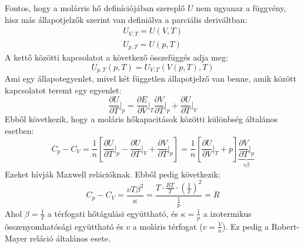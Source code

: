 \documentclass[a4paper,12pt]{article}
\begin{document}
Fontos, hogy a molárris hő definíciójában szereplő $U$ nem ugyanaz a függvény, hisz más állapotjelzők szerint van definiálva a parciális deriváltban:
\begin{equation}
    \begin{aligned}
        U_{V, T} = U(V, T) \\
        U_{p, T} = U(p, T)
    \end{aligned}
\end{equation}
A kettő közötti kapcsolatot a következő összefüggés adja meg:
\begin{equation}
U_{p, T} (p, T)= U_{V, T} (V(p, T), T)
\end{equation}
Ami egy állapotegyenlet, mivel két független állapotjelző van benne, amik között kapcsolatot teremt egy egyenlet:
\begin{equation}
    \frac{\partial U}{\partial T}\bigg|_{p} = \frac{\partial E}{\partial V}\bigg|_{T} \frac{\partial V}{\partial T}\bigg|_{p} + \frac{\partial U}{\partial T}\bigg|_{V}
\end{equation} 
Ebből következik, hogy a moláris hőkapacitások közötti különbség általános esetben:
\begin{equation}
    C_p - C_V = \frac{1}{n} \left[\frac{\partial U}{\partial T}\bigg|_{p} - \frac{\partial U}{\partial T}\bigg|_{V} + \frac{\partial V}{\partial T}\bigg|_{p}\right] = \frac{1}{n} \left[\frac{\partial U}{\partial V}\bigg|_{T} + p \right] \underbrace{\frac{\partial V}{\partial T}\bigg|_{p}}_{v \beta}
\end{equation}
Ezeket hívják Maxwell relációknak. Ebből pedig következik:
\begin{equation}
    C_p - C_V = \frac{v T \beta^2}{\kappa} = \frac{T \cdot \frac{RT}{T} \cdot (\frac{1}{T})^2}{\frac{1}{p}} = R
\end{equation}
Ahol $\beta = \frac{1}{T}$ a térfogati hőtágulási együttható, és $\kappa = \frac{1}{p}$ a izotermikus összenyomhatósági együttható és $v$ a moláris térfogat ($v = \frac{V}{n}$).
Ez pedig a Robert-Mayer reláció általános esete.
\end{document}
